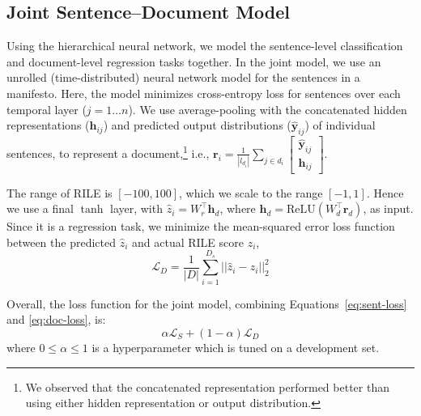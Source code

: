 \documentclass[11pt,a4paper]{article}
\newcommand{\eqnref}[2][]{Equation#1~\ref{#2}\xspace}
\begin{document}
\subsection{Joint Sentence--Document Model}
Using the hierarchical neural network, we model the sentence-level classification and document-level regression tasks together. In the joint model, we use an unrolled (time-distributed) neural network model for the sentences in a manifesto. Here, the model minimizes cross-entropy loss for sentences over each temporal layer ($j=1 \ldots n$). We use average-pooling with the concatenated hidden representations ($\mathbf{h}_{ij}$) and predicted output distributions ($\hat{\mathbf{y}}_{ij}$) of individual sentences, to represent a document,\footnote{We observed that the concatenated representation performed better than using either hidden representation or output distribution.} i.e.,
$ \mathbf{r}_i = \frac{1}{|l_{d_{i}}|}\sum_{j \in d_{i}} \left[\begin{array}{cc} \hat{\mathbf{y}}_{ij} \\ \mathbf{h}_{ij} \end{array} \right]  $.

The range of RILE is $[-100,100]$, which we scale to the range $[-1,1]$. Hence we use a final $\tanh$ layer, with $\hat{z}_i = W_{r}^\top \mathbf{h}_{d}$, where $\mathbf{h}_{d} = \text{ReLU}(W_{d}^\top \mathbf{r}_d)$, as input.
Since it is a regression task, we minimize the mean-squared error loss function between the predicted $\hat{z}_i$ and actual RILE score $z_i$,
\begin{equation}
\mathcal{L}_D = \frac{1}{|D|}  \sum_{i=1}^{D_{s}} ||\hat{z}_i - z_i||^2_2
\label{eq:doc-loss}
\end{equation}

Overall, the loss function for the joint model, combining \eqnref[s]{eq:sent-loss} and \ref{eq:doc-loss}, is:
\begin{equation}
 \alpha \mathcal{L}_S + (1-\alpha) \mathcal{L}_D
 \label{eq:joint-loss}
\end{equation}
where $0 \le \alpha \le 1$ is a hyperparameter which is tuned on a development set.
\end{document}
